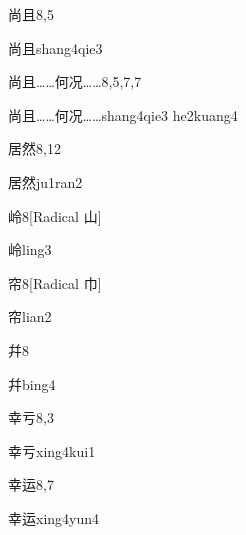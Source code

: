 \begin{entry}{尚且}{8,5}
  \begin{phonetics}{尚且}{shang4qie3}
  \end{phonetics}
\end{entry}

\begin{entry}{尚且……何况……}{8,5,7,7}
  \begin{phonetics}{尚且……何况……}{shang4qie3 he2kuang4}
  \end{phonetics}
\end{entry}

\begin{entry}{居然}{8,12}
  \begin{phonetics}{居然}{ju1ran2}
  \end{phonetics}
\end{entry}

\begin{entry}{岭}{8}[Radical 山]
  \begin{phonetics}{岭}{ling3}
  \end{phonetics}
\end{entry}

\begin{entry}{帘}{8}[Radical 巾]
  \begin{phonetics}{帘}{lian2}
  \end{phonetics}
\end{entry}

\begin{entry}{幷}{8}
  \begin{phonetics}{幷}{bing4}
  \end{phonetics}
\end{entry}

\begin{entry}{幸亏}{8,3}
  \begin{phonetics}{幸亏}{xing4kui1}
  \end{phonetics}
\end{entry}

\begin{entry}{幸运}{8,7}
  \begin{phonetics}{幸运}{xing4yun4}
  \end{phonetics}
\end{entry}

